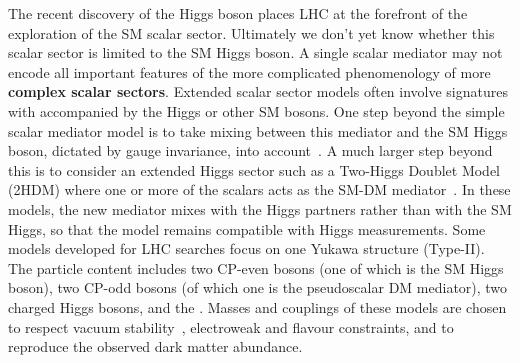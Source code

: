 


The recent discovery of the Higgs boson places LHC at the forefront of the exploration of the SM scalar sector. Ultimately we don't yet know whether this scalar sector is limited to the SM Higgs boson. A single scalar mediator may not encode all important features of the more complicated phenomenology of more \textbf{complex scalar sectors}. Extended scalar sector models often involve signatures with \MET accompanied by the Higgs or other SM bosons.
One step beyond the simple scalar mediator model is to take mixing between this mediator and the SM Higgs boson, dictated by gauge invariance, into account~\cite{Bauer:2016gys,Berlin:2014cfa}. 
A much larger step beyond this is to consider an extended Higgs sector such as a Two-Higgs Doublet Model (2HDM) where one or more of the scalars acts as the SM-DM mediator~\cite{Bauer:2017ota,Ipek:2014gua,No:2015xqa,Goncalves:2016iyg,Bell:2016ekl}. In these models, the new  mediator mixes with the Higgs partners rather than with the SM Higgs, so that the model remains compatible with Higgs measurements. Some models developed for LHC searches focus on one Yukawa structure (Type-II). The particle content includes two CP-even bosons (one of which is the SM Higgs boson), two CP-odd bosons (of which one is the pseudoscalar DM mediator), two charged Higgs bosons, and the \IP. Masses and couplings of these models are chosen to respect vacuum stability~\cite{No:2015xqa}, electroweak and flavour constraints, and to reproduce the observed dark matter abundance.


